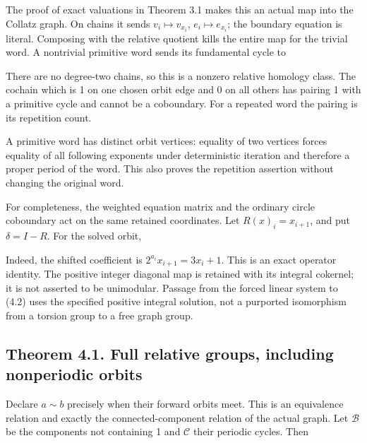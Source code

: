 The proof of exact valuations in Theorem 3.1 makes this an actual map
into the Collatz graph. On chains it sends \(v_i\mapsto v_{x_i}\),
\(e_i\mapsto e_{x_i}\); the boundary equation is literal. Composing with
the relative quotient kills the entire map for the trivial word. A
nontrivial primitive word sends its fundamental cycle to


There are no degree-two chains, so this is a nonzero relative homology
class. The cochain which is 1 on one chosen orbit edge and 0 on all
others has pairing 1 with a primitive cycle and cannot be a coboundary.
For a repeated word the pairing is its repetition count.

A primitive word has distinct orbit vertices: equality of two vertices
forces equality of all following exponents under deterministic iteration
and therefore a proper period of the word. This also proves the
repetition assertion without changing the original word.

For completeness, the weighted equation matrix and the ordinary circle
coboundary act on the same retained coordinates. Let \(R(x)_i=x_{i+1}\),
and put \(\delta=I-R\). For the solved orbit,


Indeed, the shifted coefficient is \(2^{a_i}x_{i+1}=3x_i+1\). This is an
exact operator identity. The positive integer diagonal map is retained
with its integral cokernel; it is not asserted to be unimodular. Passage
from the forced linear system to (4.2) uses the specified positive
integral solution, not a purported isomorphism from a torsion group to a
free graph group.

\subsection{Theorem 4.1. Full relative groups, including nonperiodic
orbits}

Declare \(a\sim b\) precisely when their forward orbits meet. This is an
equivalence relation and exactly the connected-component relation of the
actual graph. Let \(\mathcal B\) be the components not containing 1 and
\(\mathcal C\) their periodic cycles. Then


